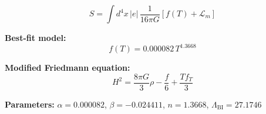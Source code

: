 
\begin{equation}
  S = \int d^4x \, |e| \, \frac{1}{16\pi G} \left[ f(T) + \mathcal{L}_m \right]
\end{equation}

\textbf{Best-fit model:}
\begin{equation}
  f(T) = 0.000082 \, T^{1.3668}
\end{equation}

\textbf{Modified Friedmann equation:}
\begin{equation}
  H^2 = \frac{8\pi G}{3} \rho - \frac{f}{6} + \frac{T f_T}{3}
\end{equation}

\textbf{Parameters:}
$\alpha = 0.000082$, \quad
$\beta = -0.024411$, \quad
$n = 1.3668$, \quad
$\Lambda_{\text{BI}} = 27.1746$